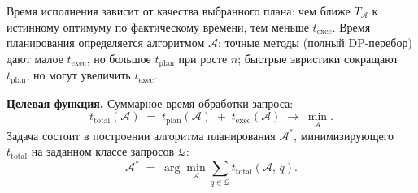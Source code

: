 Время исполнения зависит от качества выбранного плана: чем ближе $T_{\mathcal{A}}$ к истинному оптимуму
по фактическому времени, тем меньше $t_{\mathrm{exec}}$.
Время планирования определяется алгоритмом $\mathcal{A}$: точные методы (полный DP-перебор) дают
малое $t_{\mathrm{exec}}$, но большое $t_{\mathrm{plan}}$ при росте $n$;
быстрые эвристики сокращают $t_{\mathrm{plan}}$, но могут увеличить $t_{\mathrm{exec}}$.
\par

\textbf{Целевая функция.}
Суммарное время обработки запроса:
\[
    t_{\mathrm{total}}(\mathcal{A}) \;=\; t_{\mathrm{plan}}(\mathcal{A}) \;+\; t_{\mathrm{exec}}(\mathcal{A}) \;\longrightarrow\; \min_{\mathcal{A}}.
\]
Задача состоит в построении алгоритма планирования $\mathcal{A}^*$,
минимизирующего $t_{\mathrm{total}}$ на заданном классе запросов $\mathcal{Q}$:
\[
    \mathcal{A}^* \;=\; \arg\min_{\mathcal{A}} \sum_{q \in \mathcal{Q}} t_{\mathrm{total}}(\mathcal{A},\, q).
\]